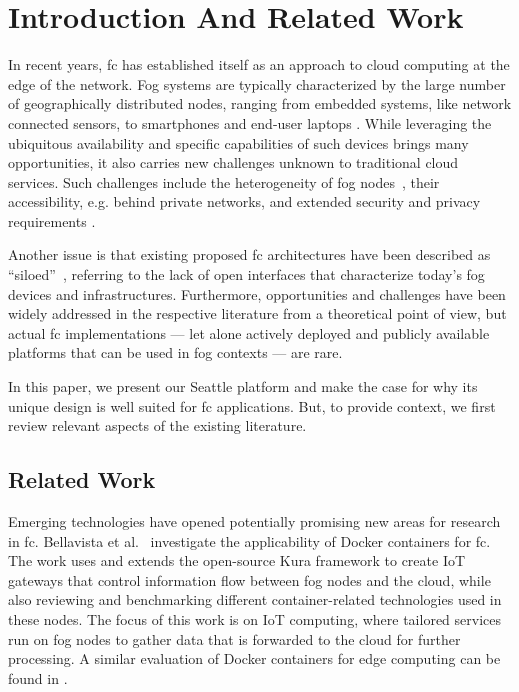 \section{Introduction And Related Work}

In recent years, \gls{fc} has established itself as an approach to
cloud computing at the edge of the network. Fog systems are typically
characterized by the large number of geographically distributed
nodes, ranging
from embedded systems, like network connected
sensors, to smartphones and end-user laptops
\cite{Bonomi:2012:FCR:2342509.2342513,Yi:2015:SFC:2757384.2757397,dastjerdi_fog_2016}.
While leveraging the
ubiquitous availability and specific capabilities of such devices brings
many opportunities, it also carries new challenges unknown to traditional cloud
services. Such challenges include the heterogeneity of fog
nodes~\cite{Bonomi:2012:FCR:2342509.2342513,7868354,Yi:2015:SFC:2757384.2757397,mahmud_fog_2016},
their accessibility, e.g. behind private networks, and extended security and
privacy requirements \cite{botta_integration_2016}.

Another issue is that existing proposed \gls{fc} architectures have
been described
as ``siloed''~\cite{belli_design_2015}, referring to the lack of
open interfaces that characterize today's fog devices and infrastructures.
Furthermore, opportunities and challenges have been widely addressed in the
respective literature from a theoretical point of view, but actual \gls{fc}
implementations --- let alone actively deployed and
publicly available platforms that can be used in fog contexts --- are rare.

In this paper, we present our Seattle platform and make the case for
why its unique design is well suited for \gls{fc} applications. But,
to provide context, we first review relevant aspects of the existing
literature.

\subsection{Related Work}

Emerging technologies have opened potentially promising new areas
for research in \gls{fc}.
Bellavista et al.~\cite{bellavista_feasibility_2017} investigate the
applicability of Docker containers for \gls{fc}. The work uses and extends
the open-source Kura framework to create \gls{IoT} gateways that control information
flow between fog nodes and the cloud, while also reviewing and benchmarking
different container-related technologies used in these nodes.
The focus of this work is on \gls{IoT} computing, where tailored services run
on fog nodes to gather data that is forwarded to the cloud for further processing.
A similar evaluation of Docker containers for edge computing can be found in
\cite{ismail_evaluation_2015}.


